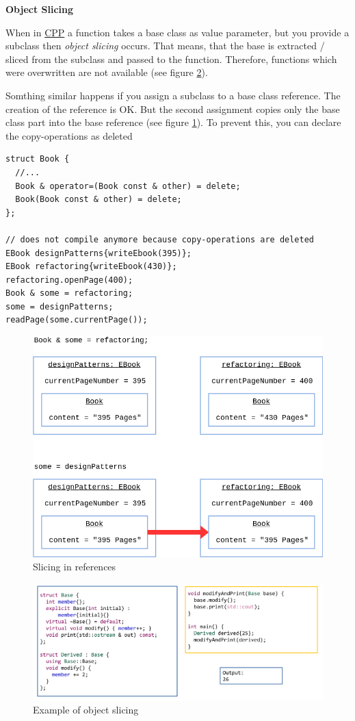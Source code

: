 \documentclass[11pt,twoside,landscape]{article}
\begin{document}
\begin{multicols}{3}
\textbf{Object Slicing}

When in \href{../../../roam/20210920103243-c.org}{CPP} a function takes a base class as value parameter, but you provide a subclass then \emph{object slicing} occurs.
That means, that the base is extracted / sliced from the subclass and passed to the function.
Therefore, functions which were overwritten are not available (see figure \ref{fig:orgbe22345}).

Somthing similar happens if you assign a subclass to a base class reference.
The creation of the reference is OK.
But the second assignment copies only the base class part into the base reference (see figure \ref{fig:org1e3f986}).
To prevent this, you can declare the copy-operations as deleted

\lstset{language=c++,label= ,caption= ,captionpos=b,numbers=none}
\begin{lstlisting}
struct Book {
  //...
  Book & operator=(Book const & other) = delete;
  Book(Book const & other) = delete;
};

// does not compile anymore because copy-operations are deleted
EBook designPatterns{writeEbook(395)};
EBook refactoring{writeEbook(430)};
refactoring.openPage(400);
Book & some = refactoring;
some = designPatterns;
readPage(some.currentPage());
\end{lstlisting}

\begin{figure}[htbp]
\centering
\includegraphics[width=.9\linewidth]{img/object_slicing_in_references.png}
\caption{\label{fig:org1e3f986}Slicing in references}
\end{figure}


\begin{figure}[htbp]
\centering
\includegraphics[width=.9\linewidth]{img/object_slicing.png}
\caption{\label{fig:orgbe22345}Example of object slicing}
\end{figure}



\end{multicols}
\end{document}
